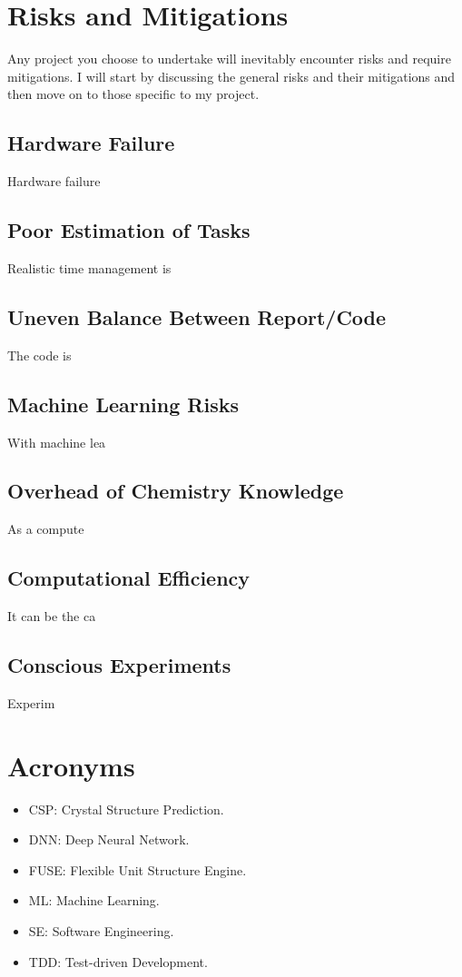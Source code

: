 \documentclass[12pt]{article}
\begin{document}
\section{Risks and Mitigations}
Any project you choose to undertake will inevitably encounter risks and require mitigations. I will start by discussing the general risks and their mitigations and then move on to those specific to my project.

\subsection{Hardware Failure}
Hardware failure

\subsection{Poor Estimation of Tasks}
Realistic time management is 

\subsection{Uneven Balance Between Report/Code}
The code is

\subsection{Machine Learning Risks}
With machine lea

\subsection{Overhead of Chemistry Knowledge}
As a compute

\subsection{Computational Efficiency}
It can be the ca

\subsection{Conscious Experiments}
Experim

\section*{Acronyms}
\begin{itemize}
    \item CSP: Crystal Structure Prediction.
    \item DNN: Deep Neural Network.
    \item FUSE: Flexible Unit Structure Engine.
    \item ML: Machine Learning.
    \item SE: Software Engineering.
    \item TDD: Test-driven Development.
\end{itemize}
\end{document}
